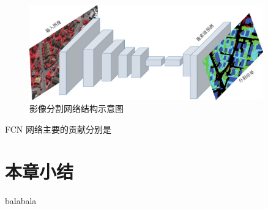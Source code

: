 \begin{figure}[htb]
  \centering
  \includegraphics[width=0.9\textwidth]{figures/FCN}
  \caption{影像分割网络结构示意图}\label{fig:fcn_structure}
\end{figure}

FCN 网络主要的贡献分别是

\section{本章小结}
\label{sec:chap02-3}
balabala